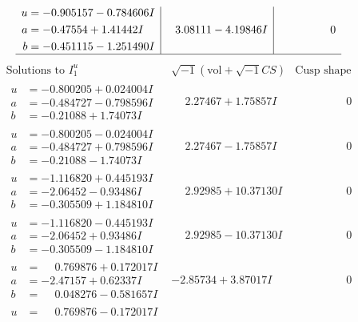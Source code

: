 \documentclass[1p]{elsarticle_modified}
\theoremstyle{definition}
\newcommand{\I}{\sqrt{-1}}
\begin{document}
$$\begin{array}{c|c|c}
\begin{aligned}
u &= -0.905157 - 0.784606 I \\
a &= -0.47554 + 1.41442 I \\
b &= -0.451115 - 1.251490 I\end{aligned}
 & \phantom{-}3.08111 - 4.19846 I & \phantom{-0.000000 } 0\\
 \hline 
 \end{array}$$\newpage$$\begin{array}{c|c|c}  
\text{Solutions to }I^u_{1}& \I (\text{vol} + \sqrt{-1}CS) & \text{Cusp shape}\\
 \hline 
\begin{aligned}
u &= -0.800205 + 0.024004 I \\
a &= -0.484727 - 0.798596 I \\
b &= -0.21088 + 1.74073 I\end{aligned}
 & \phantom{-}2.27467 + 1.75857 I & \phantom{-0.000000 } 0 \\ \hline\begin{aligned}
u &= -0.800205 - 0.024004 I \\
a &= -0.484727 + 0.798596 I \\
b &= -0.21088 - 1.74073 I\end{aligned}
 & \phantom{-}2.27467 - 1.75857 I & \phantom{-0.000000 } 0 \\ \hline\begin{aligned}
u &= -1.116820 + 0.445193 I \\
a &= -2.06452 - 0.93486 I \\
b &= -0.305509 + 1.184810 I\end{aligned}
 & \phantom{-}2.92985 + 10.37130 I & \phantom{-0.000000 } 0 \\ \hline\begin{aligned}
u &= -1.116820 - 0.445193 I \\
a &= -2.06452 + 0.93486 I \\
b &= -0.305509 - 1.184810 I\end{aligned}
 & \phantom{-}2.92985 - 10.37130 I & \phantom{-0.000000 } 0 \\ \hline\begin{aligned}
u &= \phantom{-}0.769876 + 0.172017 I \\
a &= -2.47157 + 0.62337 I \\
b &= \phantom{-}0.048276 - 0.581657 I\end{aligned}
 & -2.85734 + 3.87017 I & \phantom{-0.000000 } 0 \\ \hline\begin{aligned}
u &= \phantom{-}0.769876 - 0.172017 I \\

\end{aligned}
\end{array}$$
\end{document}
